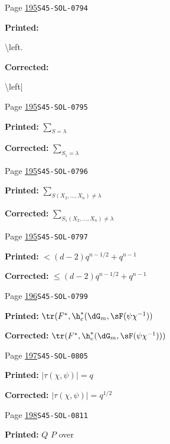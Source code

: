 \begin{description}
\smallskip
\item[\hypertarget{apparatus:EN-0125}{125}] Page \hyperlink{printpage:en:195}{195}\quad\texttt{S45-SOL-0794}
\par\noindent\textbf{Printed:} {\footnotesize\ttfamily\raggedright \textbackslash{}\allowbreak{}left.\par}
\par\noindent\textbf{Corrected:} {\footnotesize\ttfamily\raggedright \textbackslash{}\allowbreak{}left|\par}
\smallskip
\item[\hypertarget{apparatus:EN-0126}{126}] Page \hyperlink{printpage:en:195}{195}\quad\texttt{S45-SOL-0795}
\par\noindent\textbf{Printed:} \(\sum_{S=\lambda}\)
\par\noindent\textbf{Corrected:} \(\sum_{S_1=\lambda}\)
\smallskip
\item[\hypertarget{apparatus:EN-0127}{127}] Page \hyperlink{printpage:en:195}{195}\quad\texttt{S45-SOL-0796}
\par\noindent\textbf{Printed:} \(\sum_{S(X_2,\dots,X_n)\ne\lambda}\)
\par\noindent\textbf{Corrected:} \(\sum_{S_1(X_2,\dots,X_n)\ne\lambda}\)
\smallskip
\item[\hypertarget{apparatus:EN-0128}{128}] Page \hyperlink{printpage:en:195}{195}\quad\texttt{S45-SOL-0797}
\par\noindent\textbf{Printed:} \(< (d-2) q^{n-1/2} + q^{n-1}\)
\par\noindent\textbf{Corrected:} \(\leqslant (d-2) q^{n-1/2} + q^{n-1}\)
\smallskip
\item[\hypertarget{apparatus:EN-0129}{129}] Page \hyperlink{printpage:en:196}{196}\quad\texttt{S45-SOL-0799}
\par\noindent\textbf{Printed:} \(\tr(F^\ast,\h_c^\ast(\dG_m,\sF(\psi \chi^{-1}))\)
\par\noindent\textbf{Corrected:} \(\tr(F^\ast,\h_c^\ast(\dG_m,\sF(\psi \chi^{-1})))\)
\smallskip
\item[\hypertarget{apparatus:EN-0130}{130}] Page \hyperlink{printpage:en:197}{197}\quad\texttt{S45-SOL-0805}
\par\noindent\textbf{Printed:} \(|\tau(\chi,\psi)|=q\)
\par\noindent\textbf{Corrected:} \(|\tau(\chi,\psi)|=q^{1/2}\)
\smallskip
\item[\hypertarget{apparatus:EN-0131}{131}] Page \hyperlink{printpage:en:198}{198}\quad\texttt{S45-SOL-0811}
\par\noindent\textbf{Printed:} $Q$ $P$ over

\end{description}
